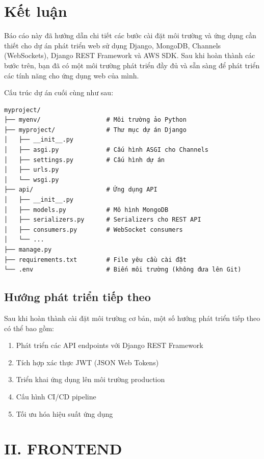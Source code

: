 \section{Kết luận}

Báo cáo này đã hướng dẫn chi tiết các bước cài đặt môi trường và ứng dụng cần thiết cho dự án phát triển web sử dụng Django, MongoDB, Channels (WebSockets), Django REST Framework và AWS SDK. Sau khi hoàn thành các bước trên, bạn đã có một môi trường phát triển đầy đủ và sẵn sàng để phát triển các tính năng cho ứng dụng web của mình.

Cấu trúc dự án cuối cùng như sau:

\begin{verbatim}
myproject/
├── myenv/                  # Môi trường ảo Python
├── myproject/              # Thư mục dự án Django
│   ├── __init__.py
│   ├── asgi.py             # Cấu hình ASGI cho Channels
│   ├── settings.py         # Cấu hình dự án
│   ├── urls.py
│   └── wsgi.py
├── api/                    # Ứng dụng API
│   ├── __init__.py
│   ├── models.py           # Mô hình MongoDB
│   ├── serializers.py      # Serializers cho REST API
│   ├── consumers.py        # WebSocket consumers
│   └── ...
├── manage.py
├── requirements.txt        # File yêu cầu cài đặt
└── .env                    # Biến môi trường (không đưa lên Git)
\end{verbatim}

\subsection{Hướng phát triển tiếp theo}

Sau khi hoàn thành cài đặt môi trường cơ bản, một số hướng phát triển tiếp theo có thể bao gồm:

\begin{enumerate}
    \item Phát triển các API endpoints với Django REST Framework
    \item Tích hợp xác thực JWT (JSON Web Tokens)
    \item Triển khai ứng dụng lên môi trường production
    \item Cấu hình CI/CD pipeline
    \item Tối ưu hóa hiệu suất ứng dụng
\end{enumerate}

\section*{II. FRONTEND}

